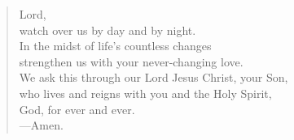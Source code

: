 \prayer

\setlength{\vleftmargin}{\prayerleftmargini}

\begin{verse}
Lord,\\
watch over us by day and by night.\\
In the midst of life’s countless changes\\
strengthen us with your never-changing love.\\
We ask this through our Lord Jesus Christ, your Son,\\
who lives and reigns with you and the Holy Spirit,\\
God, for ever and ever.\\
{\color{red}---\thinspace}Amen.
\end{verse}

\setlength{\vleftmargin}{\defleftmargini}